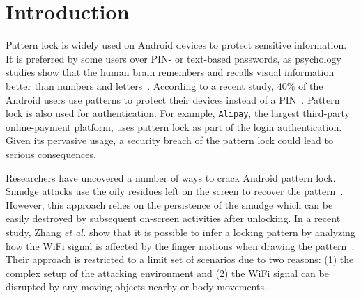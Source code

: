 \section{Introduction\label{sec:intro}}


Pattern lock is widely used on Android devices to protect sensitive information. It is preferred by some users over PIN- or text-based
passwords, as psychology studies show that the human brain remembers and
recalls visual information better than numbers and
letters~\cite{DeAngeli:2005:PRW:1090412.1090419}.
According to a recent study, 40\% of the Android users
use patterns to protect their devices instead of a PIN~\cite{androidstudy}.
Pattern lock is also used for authentication. For example, \texttt{Alipay}, the largest
third-party online-payment platform, uses pattern lock as part of the login authentication.
Given its pervasive usage, a security breach of the pattern lock could lead to serious consequences.


Researchers have uncovered a number of ways to crack Android pattern lock.
Smudge attacks use the oily residues  left on the screen to recover
the pattern~\cite{aviv2010smudge}. However, this approach relies on the persistence of
the smudge which can be easily destroyed by subsequent on-screen activities after unlocking. In a recent study, Zhang
\emph{et al.} show that it is possible to infer a locking pattern by analyzing how the WiFi signal is affected by the finger motions when drawing the pattern~\cite{zhang2016privacy}. Their approach is restricted to
a limit set of scenarios due to two reasons: (1) the complex setup of the attacking environment and (2) the WiFi signal can be disrupted by any moving
objects nearby or body movements.


